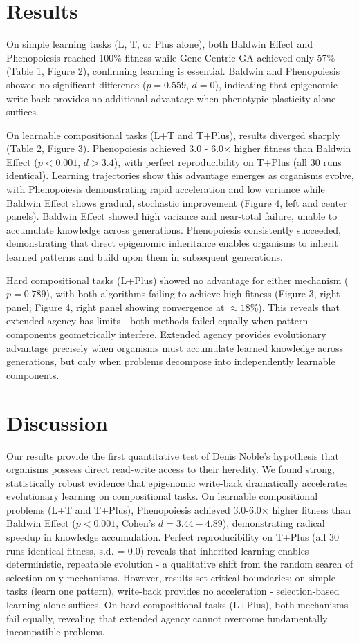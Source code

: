 \documentclass[11pt]{article}
\begin{document}
\section*{Results}

On simple learning tasks (L, T, or Plus alone), both Baldwin Effect and Phenopoiesis reached 100\% fitness while Gene-Centric GA achieved only 57\% (Table 1, Figure 2), confirming learning is essential. Baldwin and Phenopoiesis showed no significant difference ($p = 0.559$, $d = 0$), indicating that epigenomic write-back provides no additional advantage when phenotypic plasticity alone suffices.

On learnable compositional tasks (L+T and T+Plus), results diverged sharply (Table 2, Figure 3). Phenopoiesis achieved 3.0 - 6.0× higher fitness than Baldwin Effect ($p < 0.001$, $d > 3.4$), with perfect reproducibility on T+Plus (all 30 runs identical). Learning trajectories show this advantage emerges as organisms evolve, with Phenopoiesis demonstrating rapid acceleration and low variance while Baldwin Effect shows gradual, stochastic improvement (Figure 4, left and center panels). Baldwin Effect showed high variance and near-total failure, unable to accumulate knowledge across generations. Phenopoiesis consistently succeeded, demonstrating that direct epigenomic inheritance enables organisms to inherit learned patterns and build upon them in subsequent generations.

Hard compositional tasks (L+Plus) showed no advantage for either mechanism ($p = 0.789$), with both algorithms failing to achieve high fitness (Figure 3, right panel; Figure 4, right panel showing convergence at $\approx 18\%$). This reveals that extended agency has limits - both methods failed equally when pattern components geometrically interfere. Extended agency provides evolutionary advantage precisely when organisms must accumulate learned knowledge across generations, but only when problems decompose into independently learnable components.

\section*{Discussion}

Our results provide the first quantitative test of Denis Noble's hypothesis that organisms possess direct read-write access to their heredity. We found strong, statistically robust evidence that epigenomic write-back dramatically accelerates evolutionary learning on compositional tasks. On learnable compositional problems (L+T and T+Plus), Phenopoiesis achieved 3.0-6.0× higher fitness than Baldwin Effect ($p < 0.001$, Cohen's $d = 3.44 - 4.89$), demonstrating radical speedup in knowledge accumulation. Perfect reproducibility on T+Plus (all 30 runs identical fitness, s.d. = 0.0) reveals that inherited learning enables deterministic, repeatable evolution - a qualitative shift from the random search of selection-only mechanisms. However, results set critical boundaries: on simple tasks (learn one pattern), write-back provides no acceleration - selection-based learning alone suffices. On hard compositional tasks (L+Plus), both mechanisms fail equally, revealing that extended agency cannot overcome fundamentally incompatible problems.
\end{document}
